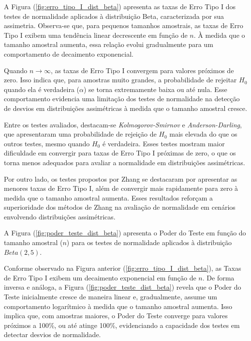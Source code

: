 \documentclass[a4paper,11pt]{article} %
\begin{document}
A Figura (\ref{fig:erro_tipo_I_dist_beta}) apresenta as taxas de Erro Tipo I dos testes de normalidade aplicados à distribuição Beta, caracterizada por sua assimetria. Observa-se que, para pequenos tamanhos amostrais, as taxas de Erro Tipo I exibem uma tendência linear decrescente em função de $n$. À medida que o tamanho amostral aumenta, essa relação evolui gradualmente para um comportamento de decaimento exponencial.

\vspace{0.5cm}

Quando $n \to \infty$, as taxas de Erro Tipo I convergem para valores próximos de zero. Isso indica que, para amostras muito grandes, a probabilidade de rejeitar $H_{0}$ quando ela é verdadeira ($\alpha$) se torna extremamente baixa ou até nula. Esse comportamento evidencia uma limitação dos testes de normalidade na detecção de desvios em distribuições assimétricas à medida que o tamanho amostral cresce.

\vspace{0.5cm}

Entre os testes avaliados, destacam-se \textit{Kolmogorov-Smirnov} e \textit{Anderson-Darling}, que apresentaram uma probabilidade de rejeição de $H_{0}$ mais elevada do que os outros testes, mesmo quando $H_{0}$ é verdadeira. Esses testes mostram maior dificuldade em convergir para taxas de Erro Tipo I próximas de zero, o que os torna menos adequados para avaliar a normalidade em distribuições assimétricas.

\vspace{0.5cm}

Por outro lado, os testes propostos por Zhang se destacaram por apresentar as menores taxas de Erro Tipo I, além de convergir mais rapidamente para zero à medida que o tamanho amostral aumenta. Esses resultados reforçam a superioridade dos métodos de Zhang na avaliação de normalidade em cenários envolvendo distribuições assimétricas.

\vspace{0.5cm}

A Figura (\ref{fig:poder_teste_dist_beta}) apresenta o Poder do Teste em função do tamanho amostral ($n$) para os testes de normalidade aplicados à distribuição $Beta(2, 5)$.

\newpage

Conforme observado na Figura anterior (\ref{fig:erro_tipo_I_dist_beta}), as Taxas de Erro Tipo I exibem um decaimento exponencial em função de $n$. De forma inversa e análoga, a Figura (\ref{fig:poder_teste_dist_beta}) revela que o Poder do Teste inicialmente cresce de maneira linear e, gradualmente, assume um comportamento logarítmico à medida que o tamanho amostral aumenta. Isso implica que, com amostras maiores, o Poder do Teste converge para valores próximos a 100\%, ou até atinge 100\%, evidenciando a capacidade dos testes em detectar desvios de normalidade.
\end{document}

